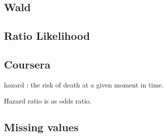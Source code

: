 \documentclass[10pt,a4paper]{article}
\begin{document}
\subsection{Wald }


\subsection{Ratio Likelihood}







\subsection{Coursera}

hazard : the risk of death at a given moment in time.

Hazard ratio is as odds ratio.

\subsection{Missing values}
\end{document}
